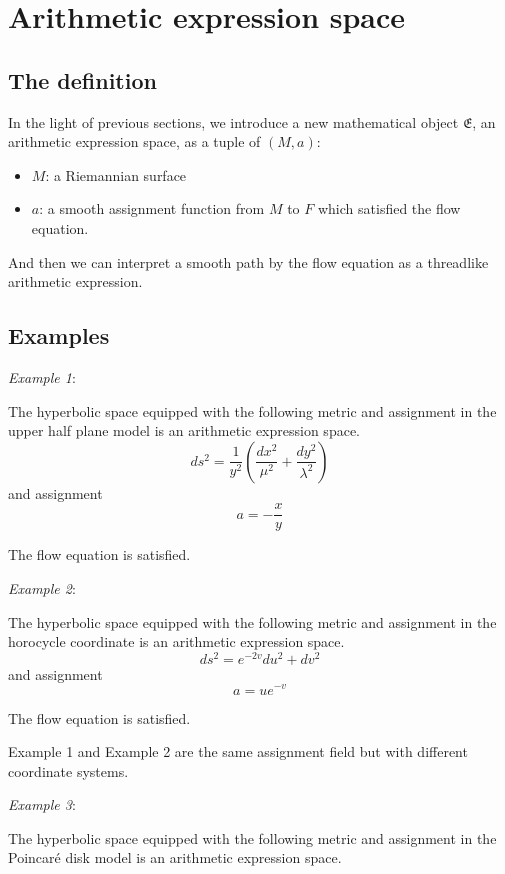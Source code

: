 \documentclass{article}
\numberwithin{definition}{section}
\numberwithin{lemma}{section}
\numberwithin{proposition}{section}
\numberwithin{corollary}{section}
\numberwithin{theorem}{section}
\begin{document}
\section{Arithmetic expression space}\label{sec:space}

\subsection{The definition}\label{subsec:definition}

In the light of previous sections, we introduce a new mathematical object $\mathfrak{E}$, an arithmetic expression space,
as a tuple of $(M, a)$:

\begin{itemize}
    \item $M$: a Riemannian surface
    \item $a$: a smooth assignment function from $M$ to $F$ which satisfied the flow equation.
\end{itemize}

And then we can interpret a smooth path by the flow equation as a threadlike arithmetic expression.

\subsection{Examples}\label{subsec:example}

\emph{Example 1}:

The hyperbolic space equipped with the following metric and assignment in the upper half plane model is an arithmetic expression space.
\[
    ds^2 = \frac{1}{y^2}(\frac{dx^2}{\mu^2} + \frac{dy^2}{\lambda^2})
\]
and assignment
\[
    a = - \frac{x}{y}
\]

The flow equation is satisfied.

\emph{Example 2}:

The hyperbolic space equipped with the following metric and assignment in the horocycle coordinate is an arithmetic expression space.
\[
    ds^2 = e^{-2v} du^2 + dv^2
\]
and assignment
\[
    a = u e^ {-v}
\]

The flow equation is satisfied.

Example 1 and Example 2 are the same assignment field but with different coordinate systems.

\emph{Example 3}:

The hyperbolic space equipped with the following metric and assignment in the Poincaré disk model is an arithmetic expression space.
\end{document}
